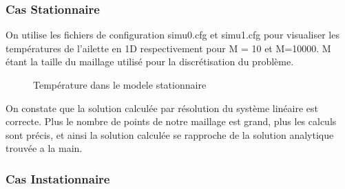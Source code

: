\documentclass[11pt]{article} %
\begin{document}
		\subsubsection{Cas Stationnaire}
\par On utilise les fichiers de configuration simu\textunderscore0.cfg et simu\textunderscore1.cfg pour visualiser les températures de l’ailette en 1D respectivement pour M = 10 et M=10000. M étant la taille du maillage utilisé pour la discrétisation du problème.
			\begin{figure}[!htb]
				\centering
				\qquad
				\caption{Température dans le modele stationnaire}%
				\label{fig:conv_stat}%
			\end{figure}
\par On constate que la solution calculée par résolution du système linéaire est correcte. Plus le nombre de points de notre maillage est grand, plus les calculs sont précis, et ainsi la solution calculée se rapproche de la solution analytique trouvée a la main.
		\subsubsection{Cas Instationnaire}
\end{document}
